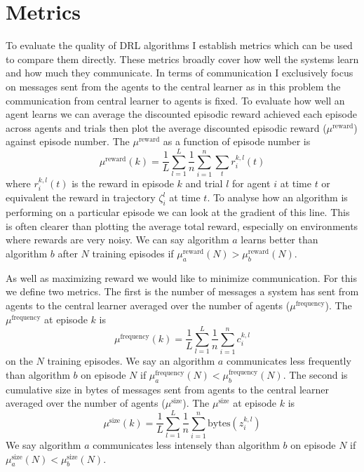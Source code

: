 \section{Metrics}
\label{sec:Metrics}
To evaluate the quality of DRL algorithms I establish metrics which can be used to compare them directly. These metrics broadly cover how well the systems learn and how much they communicate. In terms of communication I exclusively focus on messages sent from the agents to the central learner as in this problem the communication from central learner to agents is fixed. To evaluate how well an agent learns we can average the discounted episodic reward achieved each episode across agents and trials then plot the average discounted episodic reward ($\mu^{\text{reward}}$) against episode number. The $\mu^{\text{reward}}$ as a function of episode number is 
\begin{equation*}
    \mu^{\text{reward}}(k) = \frac{1}{L} \sum_{l=1}^L \frac{1}{n} \sum_{i=1}^n \sum_{t} r^{k,l}_i(t)
\end{equation*}
where $r^{k,l}_i(t)$ is the reward in episode $k$ and trial $l$ for agent $i$ at time $t$ or equivalent the reward in trajectory $\zeta^l_i$ at time $t$.
To analyse how an algorithm is performing on a particular episode we can look at the gradient of this line.
This is often clearer than plotting the average total reward, especially on environments where rewards are very noisy.
We can say algorithm $a$ learns better than algorithm $b$ after $N$ training episodes if $\mu^{\text{reward}}_a(N) > \mu^{\text{reward}}_b(N)$.

As well as maximizing reward we would like to minimize communication. For this we define two metrics. The first is the number of messages a system has sent from agents to the central learner averaged over the number of agents ($\mu^{\text{frequency}}$). The $\mu^{\text{frequency}}$ at episode $k$  is
\begin{equation*}
    \mu^{\text{frequency}}(k) = \frac{1}{L} \sum_{l=1}^L \frac{1}{n} \sum_{i=1}^n c_i^{k,l}
\end{equation*} 
on the $N$ training episodes. We say an algorithm $a$ communicates less frequently than algorithm $b$ on episode $N$ if $\mu^{\text{frequency}}_a(N) < \mu^{\text{frequency}}_b(N)$. The second is cumulative size in bytes of messages sent from agents to the central learner averaged over the number of agents ($\mu^{\text{size}}$). The $\mu^{\text{size}}$ at episode $k$ is 
\begin{equation*}
    \mu^{\text{size}}(k) = \frac{1}{L} \sum_{l=1}^L \frac{1}{n} \sum_{i=1}^n \text{bytes}(z_i^{k,l})
\end{equation*}  
We say algorithm $a$ communicates less intensely than algorithm $b$ on episode $N$ if $\mu^{\text{size}}_a(N) < \mu^{\text{size}}_b(N)$.

